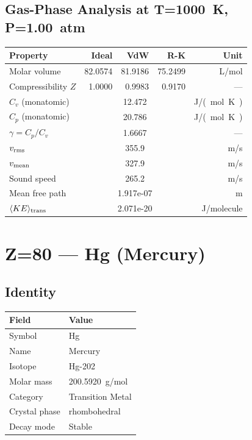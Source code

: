 \documentclass[11pt,a4paper]{article}
\begin{document}
\subsection{Gas-Phase Analysis at T=\SI{1000}{K}, P=\SI{1.00}{atm}}
\begin{tabular}{lrrrr}
  \toprule
  Property & Ideal & VdW & R-K & Unit \\
  \midrule
  Molar volume & 82.0574 & 81.9186 & 75.2499 & \si{L/mol} \\
  Compressibility $Z$ & 1.0000 & 0.9983 & 0.9170 & --- \\
  \midrule
  $C_v$ (monatomic) & \multicolumn{3}{c}{12.472} & \si{J/(mol.K)} \\
  $C_p$ (monatomic) & \multicolumn{3}{c}{20.786} & \si{J/(mol.K)} \\
  $\gamma = C_p/C_v$ & \multicolumn{3}{c}{1.6667} & --- \\
  $v_{\rm rms}$ & \multicolumn{3}{c}{355.9} & \si{m/s} \\
  $v_{\rm mean}$ & \multicolumn{3}{c}{327.9} & \si{m/s} \\
  Sound speed & \multicolumn{3}{c}{265.2} & \si{m/s} \\
  Mean free path & \multicolumn{3}{c}{1.917e-07} & \si{m} \\
  $\langle KE \rangle_{\rm trans}$ & \multicolumn{3}{c}{2.071e-20} & \si{J/molecule} \\
  \bottomrule
\end{tabular}

\newpage

\section{Z=80 --- Hg (Mercury)}
\label{sec:Z80}

\subsection{Identity}
\begin{tabular}{ll}
  \toprule
  Field & Value \\
  \midrule
  Symbol & Hg \\
  Name & Mercury \\
  Isotope & Hg-202 \\
  Molar mass & \SI{200.5920}{g/mol} \\
  Category & Transition Metal \\
  Crystal phase & rhombohedral \\
  Decay mode & Stable \\
  \bottomrule
\end{tabular}
\end{document}
